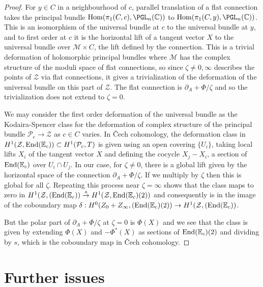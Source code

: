 \documentclass[12pt]{article}
\numberwithin{equation}{section}
\theoremstyle{remark}
\theoremstyle{definition}
\numberwithin{theorem}{section}
\DeclareMathOperator{\Hom}{Hom}
\def\E{\mathbb{E}}
\def\C{\mathbb{C}}
\def\M{{\mathcal{M}}}
\newcommand{\End}{\textnormal{End}}
\renewcommand{\1}{\mathbbm{1}}
\begin{document}
\begin{proof} For $y\in C$ in a neighbourhood of $c$,  parallel translation of a flat connection  takes the principal bundle $\Hom(\pi_1(C,c), \PGL_n(\C))$ to $\Hom(\pi_1(C,y), \PGL_n(\C))$. This is an isomorphism  of the universal bundle at $c$ to the universal bundle at $y$, and to first order at $c$ it is the horizontal lift of a tangent vector $X$ to the universal bundle over $\M\times C$, the lift defined by the connection. This is a trivial deformation of holomorphic  principal bundles where $\M$ has the complex structure of the moduli space of flat connections, so since $\zeta\ne 0,\infty$ describes the points of ${\mathcal Z}$ via flat connections, it gives a trivialization of the deformation of the universal bundle on this part of ${\mathcal Z}$. The flat connection is $\partial _A+ \Phi/\zeta$ and so the trivialization does not extend to $\zeta=0$. 
	
	We may consider the first order deformation of the universal bundle as the Kodaira-Spencer class for the deformation of complex structure of the principal bundle ${\mathcal P}_c\rightarrow {\mathcal Z}$ as $c\in C$ varies. 
	In \v Cech cohomology, the deformation class in $H^1({\mathcal Z},\End (\E_c))\subset H^1({\mathcal P}_c, T)$ is given using an open covering  $\{U_i\}$, taking  local lifts $X_i$ of the tangent vector $X$ and defining the cocycle $X_j-X_i$, a section of $\End (\E_c)$ over $U_i\cap U_j$. In our case, for $\zeta\ne 0$, there is a global lift given by the horizontal space of the connection $\partial _A+ \Phi/\zeta$. If we multiply by $\zeta$ then this is global for all $\zeta$. Repeating this process near $\zeta=\infty$ shows that the class maps to zero in $H^1({\mathcal Z},(\End (\E_c))\stackrel {s} \rightarrow H^1({\mathcal Z},\End (\E_c)(2))$ and consequently is in the image of the coboundary map $\delta:
	H^0({Z_0+Z_{\infty}},(\End (\E_c)(2))\rightarrow H^1({\mathcal Z},(\End (\E_c))$.
	
	But the polar part of $\partial _A+ \Phi/\zeta$ at $\zeta=0$ is $\Phi(X)$ and 
	we see that the class is given by extending $\Phi(X)$ and $-\Phi^*(X)$ as sections of $\End (\E_c)(2)$ and dividing by $s$, which is the coboundary map  in \v{C}ech cohomology.
\end{proof} 


\section{Further issues}
\label{further}
\end{document}
